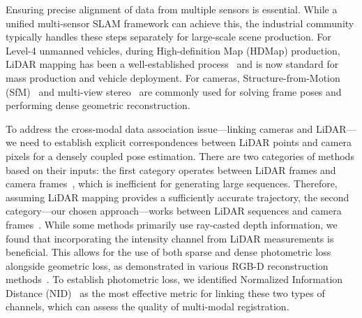 
Ensuring precise alignment of data from multiple sensors is essential. While a unified multi-sensor SLAM framework can achieve this, the industrial community typically handles these steps separately for large-scale scene production. For Level-4 unmanned vehicles, during High-definition Map (HDMap) production, LiDAR mapping has been a well-established process~\cite{yang2018pgo} and is now standard for mass production and vehicle deployment. For cameras, Structure-from-Motion (SfM)~\cite{snavely2006photo,scho2016sfm} and multi-view stereo~\cite{moulon2016openmvg,Xu2020ACMP} are commonly used for solving frame poses and performing dense geometric reconstruction.

To address the cross-modal data association issue—linking cameras and LiDAR—we need to establish explicit correspondences between LiDAR points and camera pixels for a densely coupled pose estimation. There are two categories of methods based on their inputs: the first category operates between LiDAR frames and camera frames~\cite{jing2022dxqnet}, which is inefficient for generating large sequences. Therefore, assuming LiDAR mapping provides a sufficiently accurate trajectory, the second category—our chosen approach—works between LiDAR sequences and camera frames~\cite{zhou2014colormapopt,li2024vxp}. While some methods primarily use ray-casted depth information, we found that incorporating the intensity channel from LiDAR measurements is beneficial. This allows for the use of both sparse and dense photometric loss alongside geometric loss, as demonstrated in various RGB-D reconstruction methods~\cite{Whelan15rss,dai2017bundlefusion}. To establish photometric loss, we identified Normalized Information Distance (NID)~\cite{ming2004similarity,pascoe2015robust} as the most effective metric for linking these two types of channels, which can assess the quality of multi-modal registration.

